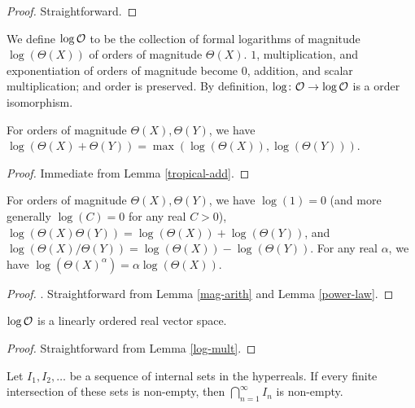 \begin{proof} Straightforward.
\end{proof}

\begin{definition} \label{log-order-def}  We define $\log {\mathcal O}$ to be the collection of formal logarithms of magnitude $\log(\Theta(X))$ of orders of magnitude $\Theta(X)$.  $1$, multiplication, and exponentiation of orders of magnitude become $0$, addition, and scalar multiplication; and order is preserved. By definition, $\log \colon {\mathcal O} \to \log {\mathcal O}$ is a order isomorphism.
\end{definition}


\begin{lemma}\label{log-add}  For orders of magnitude $\Theta(X), \Theta(Y)$, we have $\log(\Theta(X) + \Theta(Y)) = \max(\log(\Theta(X)), \log(\Theta(Y)))$.
\end{lemma}

\begin{proof} Immediate from Lemma \ref{tropical-add}.
\end{proof}

\begin{lemma}\label{log-mult}  For orders of magnitude $\Theta(X), \Theta(Y)$, we have $\log(1) = 0$ (and more generally $\log(C) = 0$ for any real $C>0$), $\log(\Theta(X) \Theta(Y)) = \log(\Theta(X)) + \log(\Theta(Y))$, and $\log(\Theta(X) / \Theta(Y)) = \log(\Theta(X)) - \log(\Theta(Y))$.  For any real $\alpha$, we have $\log(\Theta(X)^\alpha) = \alpha \log(\Theta(X))$.
\end{lemma}

\begin{proof}. Straightforward from Lemma \ref{mag-arith} and Lemma \ref{power-law}.
\end{proof}


\begin{lemma}\label{ord-vec} $\log {\mathcal O}$ is a linearly ordered real vector space.
\end{lemma}

\begin{proof} Straightforward from Lemma \ref{log-mult}.
\end{proof}

\begin{lemma}\label{saturation} Let $I_1, I_2,\dots$ be a sequence of internal sets in the hyperreals.  If every finite intersection of these sets is non-empty, then $\bigcap_{n=1}^\infty I_n$ is non-empty.
\end{lemma}

